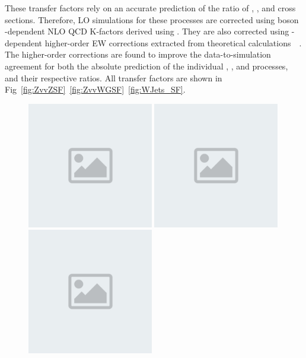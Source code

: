 These transfer factors rely on an accurate prediction of the
ratio of \Zjets, \Wjets, and \phojets cross sections. Therefore, LO simulations for these
processes are corrected using boson \pt-dependent NLO QCD K-factors derived using
\MGvATNLO. They are also corrected using \pt-dependent higher-order
EW corrections extracted from theoretical
calculations~~\cite{Denner:2009gj,Denner:2011vu,Denner:2012ts,Kuhn:2005gv,Kallweit:2014xda,Kallweit:2015dum}.
The higher-order corrections are found to improve the data-to-simulation agreement for both the
absolute prediction of the individual \Zjets, \Wjets, and \phojets processes, and their respective ratios. All transfer factors are shown in Fig~\ref{fig:ZvvZSF}~\ref{fig:ZvvWGSF}~\ref{fig:WJets_SF}.

\begin{figure}[htbp]
  \includegraphics[width=0.49\textwidth]{placeholder.png}
  \includegraphics[width=0.49\textwidth]{placeholder.png}
  \\
  \includegraphics[width=0.49\textwidth]{placeholder.png}

\end{figure}
